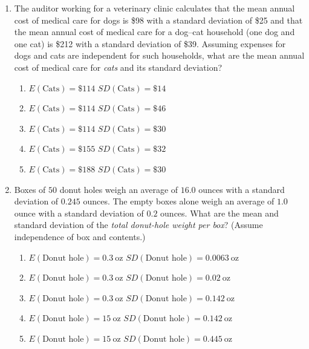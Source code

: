 \documentclass{article}
\begin{document}
\begin{enumerate}[label=\textbf{S\arabic*.}]
\item The auditor working for a veterinary clinic calculates that the mean annual cost of medical care for dogs is \$98 with a standard deviation of \$25 and that the mean annual cost of medical care for a dog–cat household (one dog and one cat) is \$212 with a standard deviation of \$39. Assuming expenses for dogs and cats are independent for such households, what are the mean annual cost of medical care for \emph{cats} and its standard deviation? 
\begin{enumerate}
  \item $E(\text{Cats})=\$114$ \quad $SD(\text{Cats})=\$14$
  \item $E(\text{Cats})=\$114$ \quad $SD(\text{Cats})=\$46$
  \item $E(\text{Cats})=\$114$ \quad $SD(\text{Cats})=\$30$
  \item $E(\text{Cats})=\$155$ \quad $SD(\text{Cats})=\$32$
  \item $E(\text{Cats})=\$188$ \quad $SD(\text{Cats})=\$30$
\end{enumerate}

\item Boxes of $50$ donut holes weigh an average of $16.0$ ounces with a standard deviation of $0.245$ ounces. The empty boxes alone weigh an average of $1.0$ ounce with a standard deviation of $0.2$ ounces. What are the mean and standard deviation of the \emph{total donut-hole weight per box}? (Assume independence of box and contents.) 
\begin{enumerate}
  \item $E(\text{Donut hole})=0.3\ \text{oz}$ \quad $SD(\text{Donut hole})=0.0063\ \text{oz}$
  \item $E(\text{Donut hole})=0.3\ \text{oz}$ \quad $SD(\text{Donut hole})=0.02\ \text{oz}$
  \item $E(\text{Donut hole})=0.3\ \text{oz}$ \quad $SD(\text{Donut hole})=0.142\ \text{oz}$
  \item $E(\text{Donut hole})=15\ \text{oz}$ \quad $SD(\text{Donut hole})=0.142\ \text{oz}$
  \item $E(\text{Donut hole})=15\ \text{oz}$ \quad $SD(\text{Donut hole})=0.445\ \text{oz}$
\end{enumerate}


\end{enumerate}
\end{document}
